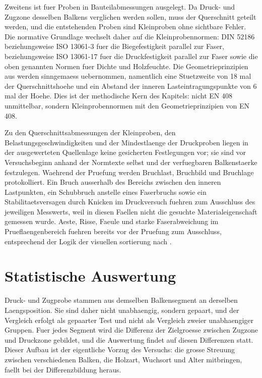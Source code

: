 Zweitens ist \textcite{en408} fuer Proben in Bauteilabmessungen ausgelegt. Da
Druck- und Zugzone desselben Balkens verglichen werden sollen, muss der
Querschnitt geteilt werden, und die entstehenden Proben sind Kleinproben ohne
sichtbare Fehler. Die normative Grundlage wechselt daher auf die
Kleinprobennormen: DIN 52186 beziehungsweise ISO 13061-3 fuer die
Biegefestigkeit parallel zur Faser, \textcite{din52185} beziehungsweise
ISO 13061-17 fuer die Druckfestigkeit parallel zur Faser
\parencite{iso13061} sowie die oben genannten Normen fuer Dichte und
Holzfeuchte. Die Geometrieprinzipien aus \textcite{en408} werden sinngemaess
uebernommen, namentlich eine Stuetzweite von 18 mal der Querschnittshoehe und
ein Abstand der inneren Lasteintragungspunkte von 6 mal der Hoehe. Dies ist
der methodische Kern des Kapitels: nicht EN 408 unmittelbar, sondern
Kleinprobennormen mit den Geometrieprinzipien von EN 408.

Zu den Querschnittsabmessungen der Kleinproben, den Belastungsgeschwindigkeiten
und der Mindestlaenge der Druckproben liegen in der ausgewerteten Quellenlage
keine gesicherten Festlegungen vor; sie sind vor Versuchsbeginn anhand der
Normtexte selbst und der verfuegbaren Balkenstaerke festzulegen. Waehrend der
Pruefung werden Bruchlast, Bruchbild und Bruchlage protokolliert. Ein Bruch
ausserhalb des Bereichs zwischen den inneren Lastpunkten, ein Schubbruch
anstelle eines Faserbruchs sowie ein Stabilitaetsversagen durch Knicken im
Druckversuch fuehren zum Ausschluss des jeweiligen Messwerts, weil in diesen
Faellen nicht die gesuchte Materialeigenschaft gemessen wurde. Aeste, Risse,
Faeule und starke Faserabweichung im Prueflaengenbereich fuehren bereits vor
der Pruefung zum Ausschluss, entsprechend der Logik der visuellen
\gls{sortierung} nach \textcite{din4074}.

\section{Statistische Auswertung}
\label{sec:auswertung}

Druck- und Zugprobe stammen aus demselben Balkensegment an derselben
Laengsposition. Sie sind daher nicht unabhaengig, sondern gepaart, und der
Vergleich erfolgt als gepaarter Test und nicht als Vergleich zweier
unabhaengiger Gruppen. Fuer jedes Segment wird die Differenz der Zielgroesse
zwischen Zugzone und Druckzone gebildet, und die Auswertung findet auf diesen
Differenzen statt. Dieser Aufbau ist der eigentliche Vorzug des Versuchs: die
grosse Streuung zwischen verschiedenen Balken, die Holzart, Wuchsort und Alter
mitbringen, faellt bei der Differenzbildung heraus.

